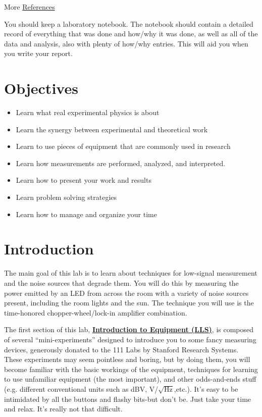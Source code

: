 \documentclass{../lab}
\begin{document}
\noindent More \hyperref[sec:References]{References}

You should keep a laboratory notebook. The notebook should contain a detailed record of everything that was done and how/why it was done, as well as all of the data and analysis, also with plenty of how/why entries. This will aid you when you write your report.

\newpage

\section{Objectives}

\begin{itemize}
    \item Learn what real experimental physics is about

    \item Learn the synergy between experimental and theoretical work

    \item Learn to use pieces of equipment that are commonly used in research

    \item Learn how measurements are performed, analyzed, and interpreted.

    \item Learn how to present your work and results

    \item Learn problem solving strategies

    \item Learn how to manage and organize your time

\end{itemize}

\section{Introduction}

The main goal of this lab is to learn about techniques for low-signal measurement and the noise sources that degrade them. You will do this by measuring the power emitted by an LED from across the room with a variety of noise sources present, including the room lights and the sun. The technique you will use is the time-honored chopper-wheel/lock-in amplifier combination.

The first section of this lab, \href{https://berkeley-physics111b.github.io/appendices/IntroductiontoEquipment/}{\textbf{Introduction to Equipment (LLS)}}, is composed of several ``mini-experiments'' designed to introduce you to some fancy measuring devices, generously donated to the 111 Labs by Stanford Research Systems. These experiments may seem pointless and boring, but by doing them, you will become familiar with the basic workings of the equipment, techniques for learning to use unfamiliar equipment (the most important), and other odds-and-ends stuff (e.g. different conventional units such as dBV, V/${\sqrt{\textrm{Hz}}}$,etc.). It's easy to be intimidated by all the buttons and flashy bits-but don't be. Just take your time and relax. It's really not that difficult.
\end{document}
